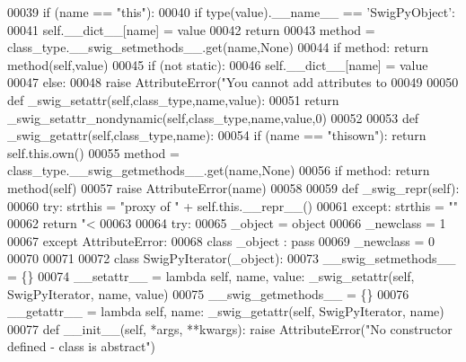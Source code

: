 \begin{DoxyCode}
00039     \textcolor{keywordflow}{if} (name == \textcolor{stringliteral}{"this"}):
00040         \textcolor{keywordflow}{if} type(value).\_\_name\_\_ == \textcolor{stringliteral}{'SwigPyObject'}:
00041             self.\_\_dict\_\_[name] = value
00042             \textcolor{keywordflow}{return}
00043     method = class\_type.\_\_swig\_setmethods\_\_.get(name,\textcolor{keywordtype}{None})
00044     \textcolor{keywordflow}{if} method: \textcolor{keywordflow}{return} method(self,value)
00045     \textcolor{keywordflow}{if} (\textcolor{keywordflow}{not} static):
00046         self.\_\_dict\_\_[name] = value
00047     \textcolor{keywordflow}{else}:
00048         \textcolor{keywordflow}{raise} AttributeError(\textcolor{stringliteral}{"You cannot add attributes to %
00049 
00050 \textcolor{keyword}{def }_swig_setattr(self,class\_type,name,value):
00051     \textcolor{keywordflow}{return} _swig_setattr_nondynamic(self,class\_type,name,value,0)
00052 
00053 \textcolor{keyword}{def }_swig_getattr(self,class\_type,name):
00054     \textcolor{keywordflow}{if} (name == \textcolor{stringliteral}{"thisown"}): \textcolor{keywordflow}{return} self.this.own()
00055     method = class\_type.\_\_swig\_getmethods\_\_.get(name,\textcolor{keywordtype}{None})
00056     \textcolor{keywordflow}{if} method: \textcolor{keywordflow}{return} method(self)
00057     \textcolor{keywordflow}{raise} AttributeError(name)
00058 
00059 \textcolor{keyword}{def }_swig_repr(self):
00060     \textcolor{keywordflow}{try}: strthis = \textcolor{stringliteral}{"proxy of "} + self.this.\_\_repr\_\_()
00061     \textcolor{keywordflow}{except}: strthis = \textcolor{stringliteral}{""}
00062     \textcolor{keywordflow}{return} \textcolor{stringliteral}{"<%
00063 
00064 \textcolor{keywordflow}{try}:
00065     \_object = object
00066     \_newclass = 1
00067 \textcolor{keywordflow}{except} AttributeError:
00068     \textcolor{keyword}{class }_object : \textcolor{keyword}{pass}
00069     \_newclass = 0
00070 
00071 
00072 \textcolor{keyword}{class }SwigPyIterator(_object):
00073     \_\_swig\_setmethods\_\_ = \{\}
00074     \_\_setattr\_\_ = \textcolor{keyword}{lambda} self, name, value: _swig_setattr(self, SwigPyIterator, name, value)
00075     \_\_swig\_getmethods\_\_ = \{\}
00076     \_\_getattr\_\_ = \textcolor{keyword}{lambda} self, name: _swig_getattr(self, SwigPyIterator, name)
00077     \textcolor{keyword}{def }__init__(self, *args, **kwargs): \textcolor{keywordflow}{raise} AttributeError(\textcolor{stringliteral}{"No constructor defined - class is abstract"})
}}
\end{DoxyCode}
